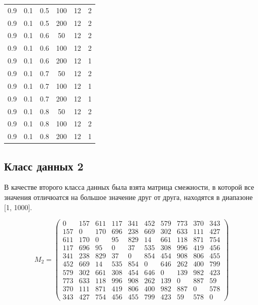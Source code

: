 \documentclass[a4paper,14pt, unknownkeysallowed]{extreport}
\begin{document}
\begin{center}
\begin{longtable}[c]{|c|c|c|c|c|c|}
	0.9 &  0.1 &  0.5 &  100 &    12 &     2 \\
	0.9 &  0.1 &  0.5 &  200 &    12 &     2 \\
   \hline
	0.9 &  0.1 &  0.6 &   50 &    12 &     2 \\
	0.9 &  0.1 &  0.6 &  100 &    12 &     2 \\
	0.9 &  0.1 &  0.6 &  200 &    12 &     1 \\
   \hline
	0.9 &  0.1 &  0.7 &   50 &    12 &     2 \\
	0.9 &  0.1 &  0.7 &  100 &    12 &     1 \\
	0.9 &  0.1 &  0.7 &  200 &    12 &     1 \\
   \hline
	0.9 &  0.1 &  0.8 &   50 &    12 &     2 \\
	0.9 &  0.1 &  0.8 &  100 &    12 &     2 \\
	0.9 &  0.1 &  0.8 &  200 &    12 &     1 \\
   \hline
\end{longtable}
\end{center}

\clearpage

\subsection{Класс данных 2}

В качестве второго класса данных была взята матрица смежности, в которой все значения отличюатся на большое значение друг от друга, находятся в диапазоне [1, 1000].

\begin{equation}
    \label{eq:kd2}
	M_{2} = \begin{pmatrix}
		0 & 157 & 611 & 117 & 341 & 452 & 579 & 773 & 370 & 343 \\
		157 & 0 & 170 & 696 & 238 & 669 & 302 & 633 & 111 & 427 \\
		611 & 170 & 0 & 95 & 829 & 14 & 661 & 118 & 871 & 754 \\
		117 & 696 & 95 & 0 & 37 & 535 & 308 & 996 & 419 & 456 \\
		341 & 238 & 829 & 37 & 0 & 854 & 454 & 908 & 806 & 455 \\
		452 & 669 & 14 & 535 & 854 & 0 & 646 & 262 & 400 & 799 \\
		579 & 302 & 661 & 308 & 454 & 646 & 0 & 139 & 982 & 423 \\
		773 & 633 & 118 & 996 & 908 & 262 & 139 & 0 & 887 & 59 \\
		370 & 111 & 871 & 419 & 806 & 400 & 982 & 887 & 0 & 578 \\
		343 & 427 & 754 & 456 & 455 & 799 & 423 & 59 & 578 & 0 
	\end{pmatrix}
\end{equation}
\end{document}
